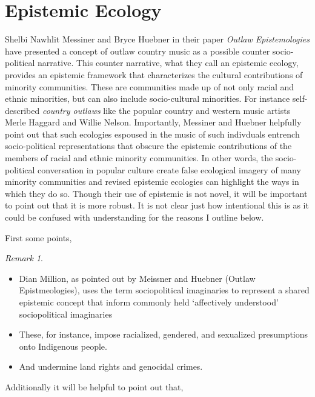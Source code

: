 \documentclass[
  12pt,
]{book}
\providecommand{\tightlist}{%
  \setlength{\itemsep}{0pt}\setlength{\parskip}{0pt}}
\providecommand{\tightlist}{%
  \setlength{\itemsep}{0pt}\setlength{\parskip}{0pt}}
\theoremstyle{definition}
\theoremstyle{definition}
\theoremstyle{definition}
\theoremstyle{definition}
\theoremstyle{remark}
\newtheorem*{remark}{Remark}
\begin{document}
\section{Epistemic Ecology}\label{epistemic-ecology}

Shelbi Nawhlit Messiner and Bryce Huebner in their paper \emph{Outlaw Epistemologies} have presented a concept of outlaw country music as a possible counter socio-political narrative. This counter narrative, what they call an epistemic ecology, provides an epistemic framework that characterizes the cultural contributions of minority communities. These are communities made up of not only racial and ethnic minorities, but can also include socio-cultural minorities. For instance self-described \emph{country outlaws} like the popular country and western music artists Merle Haggard and Willie Nelson. Importantly, Messiner and Huebner helpfully point out that such ecologies espoused in the music of such indivduals entrench socio-political representations that obscure the epistemic contributions of the members of racial and ethnic minority communities. In other words, the socio-political conversation in popular culture create false ecological imagery of many minority communities and revised epistemic ecologies can highlight the ways in which they do so. Though their use of epistemic is not novel, it will be important to point out that it is more robust. It is not clear just how intentional this is as it could be confused with understanding for the reasons I outline below.

First some points,

\begin{remark}
\leavevmode

\begin{itemize}
\tightlist
\item
  Dian Million, as pointed out by Meissner and Huebner (Outlaw Epistmeologies), uses the term sociopolitical imaginaries to represent a shared epistemic concept that inform commonly held `affectively understood' sociopolitical imaginaries
\item
  These, for instance, impose racialized, gendered, and sexualized presumptions onto Indigenous people.
\item
  And undermine land rights and genocidal crimes.
\end{itemize}

\end{remark}

Additionally it will be helpful to point out that,
\end{document}
